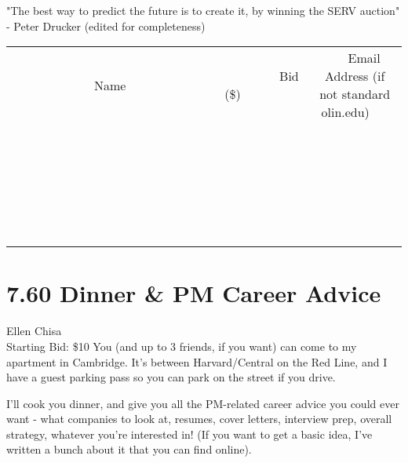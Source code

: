 \documentclass[11pt]{article}
\begin{document}
"The best way to predict the future is to create it, by winning the SERV auction" - Peter Drucker (edited for completeness)
\\[6ex]
\begin{tabular}{c c c}
~~~~~~~~~~~~~Name~~~~~~~~~~~~~ & ~~~~~~~~~Bid (\$)~~~~~~~~~  & ~~~Email Address (if not standard olin.edu)~~~\\
 & & \\
\hline
 & & \\
\hline
 & & \\
\hline
 & & \\
\hline
 & & \\
\hline
 & & \\
\hline
 & & \\
\hline
 & & \\
\hline
 & & \\
\hline
 & & \\
\hline
 & & \\
\hline
 & & \\
\hline
 & & \\
\hline
 & & \\
\hline
 & & \\
\hline
 & & \\
\hline
 & & \\
\hline
 & & \\
\hline
 & & \\
\hline
 & & \\
\hline
 & & \\
\hline
 & & \\
\hline
 & & \\
\hline
 & & \\
\hline
 & & \\
\hline
 & & \\
\hline
\end{tabular}
\newpage
\section*{7.60 Dinner \& PM Career Advice}
Ellen Chisa
\\
Starting Bid: \$10
\newline
You (and up to 3 friends, if you want) can come to my apartment in Cambridge. It's between Harvard/Central on the Red Line, and I have a guest parking pass so you can park on the street if you drive.

I'll cook you dinner, and give you all the PM-related career advice you could ever want - what companies to look at, resumes, cover letters, interview prep, overall strategy, whatever you're interested in! (If you want to get a basic idea, I've written a bunch about it that you can find online).
\end{document}
